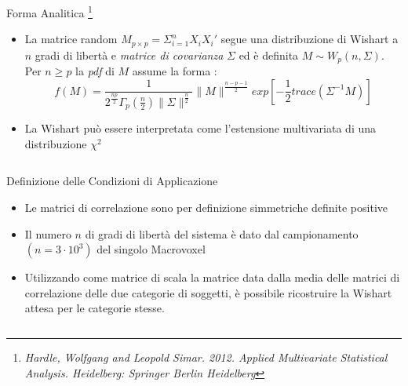 \documentclass{beamer}
\begin{document}
\begin{frame}
\begin {columns}
\begin{column}{0.8\linewidth}
\begin{block}{Forma Analitica \footnote{\textit{Hardle, Wolfgang and Leopold Simar. 2012. Applied Multivariate Statistical Analysis. Heidelberg: Springer Berlin Heidelberg}}}

\begin{itemize}
\item La matrice random $M_{p\times p}=\Sigma^n_{i=1}X_iX_i'$ segue una distribuzione di Wishart a $n$ gradi di libertà e \textit{matrice di covarianza} $\Sigma$ ed è definita $M\sim W_p(n, \Sigma)$.
Per $n\geq p$ la \textit{pdf} di $M$ assume la forma :
\begin{equation}
f(M)=\frac{1}{2^{\frac{np}{2}}\Gamma_p(\frac{n}{2})\|\Sigma\|^{\frac{n}{2}}}\|M\|^{\frac{n-p-1}{2}}exp[-\frac{1}{2}trace(\Sigma^{-1}M)]
\end{equation}

\item La Wishart può essere interpretata come l'estensione multivariata di una distribuzione $\chi^2$

\end{itemize}

\end{block}


\end{column}
\end{columns}
\end{frame}


\begin{frame}
\begin {columns}
\begin{column}{0.8\linewidth}
\begin{block} {Definizione delle Condizioni di Applicazione}
\begin{itemize}
\item Le matrici di correlazione sono per definizione simmetriche definite positive

\item Il numero $n$ di gradi di libertà del sistema è dato dal campionamento $(n=3\cdot 10^3)$ del singolo Macrovoxel

\item Utilizzando come matrice di scala la matrice data dalla media delle matrici di correlazione delle due categorie di soggetti, è possibile ricostruire la Wishart attesa per le categorie stesse.

\end{itemize}

\end{block}


\end{column}
\end{columns}
\end{frame}
\end{document}

